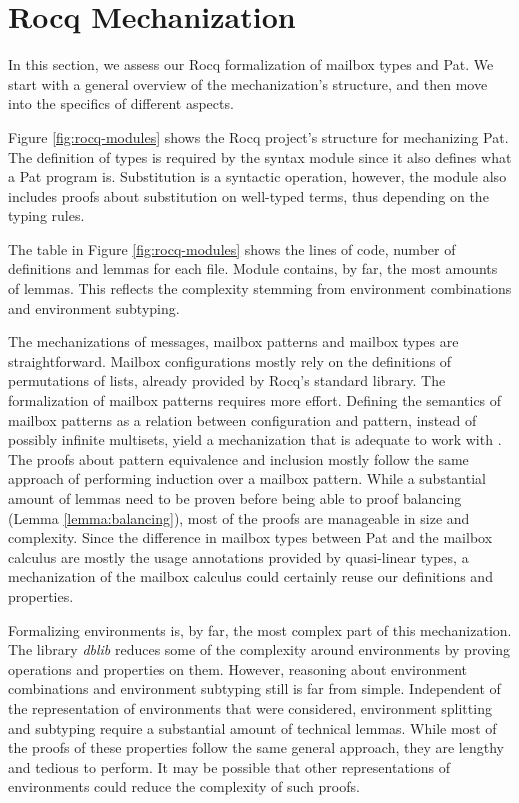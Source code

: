 \section{Rocq Mechanization}
\label{sec:rocq-mechanization}

In this section, we assess our Rocq formalization of mailbox types and Pat.
We start with a general overview of the mechanization's structure, and then move into the specifics of different aspects.

Figure \ref{fig:rocq-modules} shows the Rocq project's structure for mechanizing Pat.
The definition of types is required by the syntax module since it also defines what a Pat program is.
Substitution is a syntactic operation, however, the module also includes proofs about substitution on well-typed terms, thus depending on the typing rules.

The table in Figure \ref{fig:rocq-modules} shows the lines of code, number of definitions and lemmas for each file.
Module  contains, by far, the most amounts of lemmas.
This reflects the complexity stemming from environment combinations and environment subtyping.

The mechanizations of messages, mailbox patterns and mailbox types are straightforward.
Mailbox configurations mostly rely on the definitions of permutations of lists, already provided by Rocq's standard library.
The formalization of mailbox patterns requires more effort.
Defining the semantics of mailbox patterns as a relation between configuration and pattern, instead of possibly infinite multisets,
yield a mechanization that is adequate to work with .
The proofs about pattern equivalence and inclusion mostly follow the same approach of performing induction over a mailbox pattern.
While a substantial amount of lemmas need to be proven before being able to proof balancing (Lemma \ref{lemma:balancing}), most of
the proofs are manageable in size and complexity.
Since the difference in mailbox types between Pat and the mailbox calculus are mostly the usage annotations provided by quasi-linear types,
a mechanization of the mailbox calculus could certainly reuse our definitions and properties.

Formalizing environments is, by far, the most complex part of this mechanization.
The library \emph{dblib} reduces some of the complexity around environments by proving operations and properties on them.
However, reasoning about environment combinations and environment subtyping still is far from simple.
Independent of the representation of environments that were considered, environment splitting and subtyping require a substantial amount of technical lemmas.
While most of the proofs of these properties follow the same general approach, they are lengthy and tedious to perform.
It may be possible that other representations of environments could reduce the complexity of such proofs.


